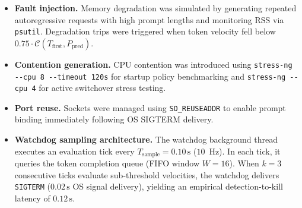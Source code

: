 \documentclass[11pt,a4paper]{article}
\newcommand{\Tfirst}{T_{\mathrm{first}}}
\newcommand{\Ppred}{P_{\mathrm{pred}}}
\newcommand{\Cfun}{\mathcal{C}}
\newcommand{\su}{\,\mathrm{s}}
\newcommand{\code}[1]{\texttt{#1}}
\begin{document}
\begin{itemize}[leftmargin=*]
\item \textbf{Fault injection.} Memory degradation was simulated by generating repeated autoregressive requests with high prompt lengths and monitoring RSS via \code{psutil}. Degradation trips were triggered when token velocity fell below $0.75 \cdot \Cfun(\Tfirst, \Ppred)$.
\item \textbf{Contention generation.} CPU contention was introduced using \code{stress-ng -{}-cpu 8 -{}-timeout 120s} for startup policy benchmarking and \code{stress-ng -{}-cpu 4} for active switchover stress testing.
\item \textbf{Port reuse.} Sockets were managed using \code{SO\_REUSEADDR} to enable prompt binding immediately following OS SIGTERM delivery.
\item \textbf{Watchdog sampling architecture.} The watchdog background thread executes an evaluation tick every $T_{\mathrm{sample}} = 0.10\su$ ($10$~Hz). In each tick, it queries the token completion queue (FIFO window $W=16$). When $k=3$ consecutive ticks evaluate sub-threshold velocities, the watchdog delivers \code{SIGTERM} ($0.02\su$ OS signal delivery), yielding an empirical detection-to-kill latency of $0.12\su$.
\end{itemize}
\end{document}
